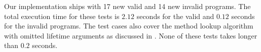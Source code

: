 Our implementation ships with 17 new valid and 14 new invalid programs.
The total execution time for these tests is $2.12$ seconds for the valid and $0.12$ seconds for the invalid programs.
The test cases also cover the method lookup algorithm with omitted lifetime arguments as discussed in .
None of these tests takes longer than $0.2$ seconds.
